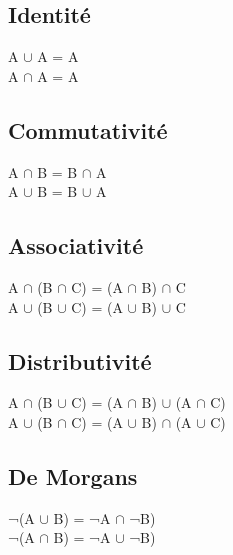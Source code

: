 \vspace{3mm} %
\subsection{Identité}
\vspace{3mm} %

A $\cup$ A = A \\
A $\cap$ A = A \\

\vspace{3mm} %
\subsection{Commutativité}
\vspace{3mm} %

A $\cap$ B  = B $\cap$ A \\
A $\cup$ B  = B $\cup$ A \\

\vspace{3mm} %
\subsection{Associativité}
\vspace{3mm} %

A $\cap$ (B $\cap$ C) = (A $\cap$ B) $\cap$ C \\
A $\cup$ (B $\cup$ C) = (A $\cup$ B) $\cup$ C \\

\vspace{3mm} %
\subsection{Distributivité}
\vspace{3mm} %

A $\cap$ (B $\cup$ C) = (A $\cap$ B) $\cup$ (A $\cap$ C) \\
A $\cup$ (B $\cap$ C) = (A $\cup$ B) $\cap$ (A $\cup$ C) \\

\vspace{3mm} %
\subsection{De Morgans}
\vspace{3mm} %

¬(A $\cup$ B) = ¬A $\cap$ ¬B) \\
¬(A $\cap$ B) = ¬A $\cup$ ¬B) \\
